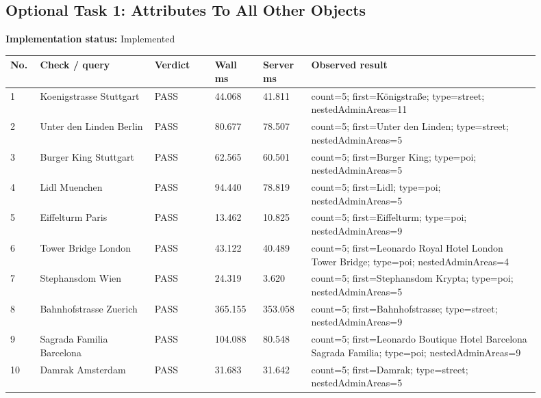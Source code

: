\documentclass[10pt,a4paper]{article}
\begin{document}
\subsection{Optional Task 1: Attributes To All Other Objects}
\textbf{Implementation status:} Implemented\\
\scriptsize
\begin{longtable}{|P{0.045\linewidth}|P{0.19\linewidth}|P{0.105\linewidth}|P{0.085\linewidth}|P{0.085\linewidth}|P{0.385\linewidth}|}
\hline
\textbf{No.} & \textbf{Check / query} & \textbf{Verdict} & \textbf{Wall ms} & \textbf{Server ms} & \textbf{Observed result}\\ \hline
{} 1 & Koenigstrasse Stuttgart & PASS & 44.068 & 41.811 & count=5; first=Königstraße; type=street; nestedAdminAreas=11\\ \hline
{} 2 & Unter den Linden Berlin & PASS & 80.677 & 78.507 & count=5; first=Unter den Linden; type=street; nestedAdminAreas=5\\ \hline
{} 3 & Burger King Stuttgart & PASS & 62.565 & 60.501 & count=5; first=Burger King; type=poi; nestedAdminAreas=5\\ \hline
{} 4 & Lidl Muenchen & PASS & 94.440 & 78.819 & count=5; first=Lidl; type=poi; nestedAdminAreas=5\\ \hline
{} 5 & Eiffelturm Paris & PASS & 13.462 & 10.825 & count=5; first=Eiffelturm; type=poi; nestedAdminAreas=9\\ \hline
{} 6 & Tower Bridge London & PASS & 43.122 & 40.489 & count=5; first=Leonardo Royal Hotel London Tower Bridge; type=poi; nestedAdminAreas=4\\ \hline
{} 7 & Stephansdom Wien & PASS & 24.319 & 3.620 & count=5; first=Stephansdom Krypta; type=poi; nestedAdminAreas=5\\ \hline
{} 8 & Bahnhofstrasse Zuerich & PASS & 365.155 & 353.058 & count=5; first=Bahnhofstrasse; type=street; nestedAdminAreas=9\\ \hline
{} 9 & Sagrada Familia Barcelona & PASS & 104.088 & 80.548 & count=5; first=Leonardo Boutique Hotel Barcelona Sagrada Familia; type=poi; nestedAdminAreas=9\\ \hline
{} 10 & Damrak Amsterdam & PASS & 31.683 & 31.642 & count=5; first=Damrak; type=street; nestedAdminAreas=5\\ \hline
\end{longtable}
\normalsize
\end{document}

